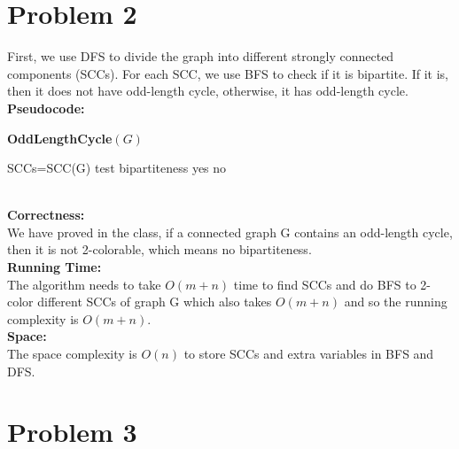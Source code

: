 \documentclass[twoside]{homework}
\begin{document}
\section*{Problem 2}
First, we use DFS to divide the graph into different strongly connected components (SCCs). For each SCC, we use BFS to check if it is bipartite. If it is, then it does not have odd-length cycle, otherwise, it has odd-length cycle.
\\\textbf{Pseudocode:} \quad
\begin{algorithm}
	\caption*{\textbf{OddLengthCycle$(G)$}}
	\begin{algorithmic}
		\STATE SCCs=SCC(G)
		\STATE test bipartiteness
		\RETURN yes 
		\ENDIF
		\ENDFOR
		\RETURN no
	\end{algorithmic}		
\end{algorithm}
\\\textbf{Correctness:} 
\\We have proved in the class, if a connected graph G contains an odd-length cycle, then it is not 2-colorable, which means no bipartiteness.   
\\\textbf{Running Time:} \quad
\\The algorithm needs to take $O(m+n)$ time to find SCCs and do BFS to 2-color different SCCs of graph G which also takes $O(m+n)$ and  so the running complexity is $O(m+n)$.
\\\textbf{Space:} \quad
\\The space complexity is $O(n)$ to store SCCs and extra variables in BFS and DFS.

\section*{Problem 3}
\end{document}
